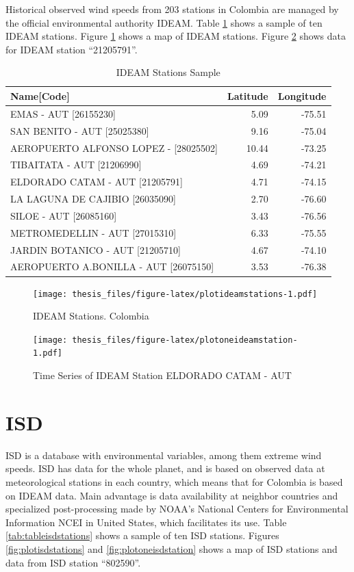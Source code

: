 \documentclass[12pt,twoside]{reedthesis}
\begin{document}
Historical observed wind speeds from 203 stations in Colombia are managed by the official environmental authority IDEAM. Table \ref{tab:tableideamstations} shows a sample of ten IDEAM stations. Figure \ref{fig:plotideamstations} shows a map of IDEAM stations. Figure \ref{fig:plotoneideamstation} shows data for IDEAM station ``21205791''.

\begingroup\fontsize{10}{12}\selectfont
\begin{longtable}[t]{lrr}
\caption[IDEAM Stations Sample]{\label{tab:tableideamstations}IDEAM Stations Sample}\\
\toprule
Name[Code] & Latitude & Longitude\\
\midrule
EMAS - AUT [26155230] & 5.09 & -75.51\\
SAN BENITO - AUT [25025380] & 9.16 & -75.04\\
AEROPUERTO ALFONSO LOPEZ - [28025502] & 10.44 & -73.25\\
TIBAITATA - AUT [21206990] & 4.69 & -74.21\\
ELDORADO CATAM - AUT [21205791] & 4.71 & -74.15\\
\addlinespace
LA LAGUNA DE CAJIBIO [26035090] & 2.70 & -76.60\\
SILOE - AUT [26085160] & 3.43 & -76.56\\
METROMEDELLIN - AUT [27015310] & 6.33 & -75.55\\
JARDIN BOTANICO  - AUT [21205710] & 4.67 & -74.10\\
AEROPUERTO A.BONILLA - AUT [26075150] & 3.53 & -76.38\\
\bottomrule
\end{longtable}
\endgroup{}
\begin{figure}
\centering
\texttt{[image: thesis\_files/figure-latex/plotideamstations-1.pdf]}
\caption{\label{fig:plotideamstations}IDEAM Stations. Colombia}
\end{figure}
\begin{figure}
\centering
\texttt{[image: thesis\_files/figure-latex/plotoneideamstation-1.pdf]}
\caption{\label{fig:plotoneideamstation}Time Series of IDEAM Station ELDORADO CATAM - AUT}
\end{figure}
\hypertarget{isd}{%
\section{ISD}\label{isd}}

ISD is a database with environmental variables, among them extreme wind speeds. ISD has data for the whole planet, and is based on observed data at meteorological stations in each country, which means that for Colombia is based on IDEAM data. Main advantage is data availability at neighbor countries and specialized post-processing made by NOAA's National Centers for Environmental Information NCEI in United States, which facilitates its use. Table \ref{tab:tableisdstations} shows a sample of ten ISD stations. Figures \ref{fig:plotisdstations} and \ref{fig:plotoneisdstation} shows a map of ISD stations and data from ISD station ``802590''.
\end{document}
